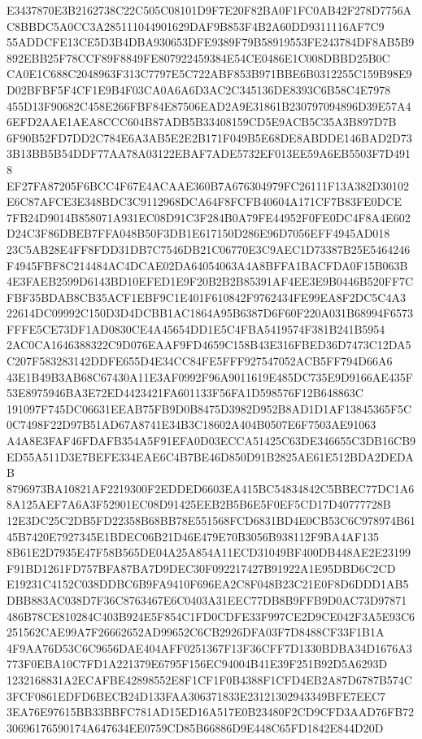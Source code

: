 \documentclass[UTF8,fontset=fandol,zihao=-4,a4paper]{ctexart}
\begin{document}
{{E3437870E3B2162738C22C505C08101D9F7E20F82BA0F1FC0AB42F278D7756AC8BBDC5A0CC3A285111044901629DAF9B853F4B2A60DD9311116AF7C9
55ADDCFE13CE5D3B4DBA930653DFE9389F79B58919553FE243784DF8AB5B9892EBB25F78CCF89F8849FE807922459384E54CE0486E1C008DBBD25B0C
CA0E1C688C2048963F313C7797E5C722ABF853B971BBE6B0312255C159B98E9D02BFBF5F4CF1E9B4F03CA0A6A6D3AC2C345136DE8393C6B58C4E7978
455D13F90682C458E266FBF84E87506EAD2A9E31861B230797094896D39E57A46EFD2AAE1AEA8CCC604B87ADB5B33408159CD5E9ACB5C35A3B897D7B
6F90B52FD7DD2C784E6A3AB5E2E2B171F049B5E68DE8ABDDE146BAD2D733B13BB5B54DDF77AA78A03122EBAF7ADE5732EF013EE59A6EB5503F7D4918
EF27FA87205F6BCC4F67E4ACAAE360B7A676304979FC26111F13A382D30102E6C87AFCE3E348BDC3C9112968DCA64F8FCFB40604A171CF7B83FE0DCE
7FB24D9014B858071A931EC08D91C3F284B0A79FE44952F0FE0DC4F8A4E602D24C3F86DBEB7FFA048B50F3DB1E617150D286E96D7056EFF4945AD018
23C5AB28E4FF8FDD31DB7C7546DB21C06770E3C9AEC1D73387B25E5464246F4945FBF8C214484AC4DCAE02DA64054063A4A8BFFA1BACFDA0F15B063B
4E3FAEB2599D6143BD10EFED1E9F20B2B2B85391AF4EE3E9B0446B520FF7CFBF35BDAB8CB35ACF1EBF9C1E401F610842F9762434FE99EA8F2DC5C4A3
22614DC09992C150D3D4DCBB1AC1864A95B6387D6F60F220A031B68994F6573FFFE5CE73DF1AD0830CE4A45654DD1E5C4FBA5419574F381B241B5954
2AC0CA1646388322C9D076EAAF9FD4659C158B43E316FBED36D7473C12DA5C207F583283142DDFE655D4E34CC84FE5FFF927547052ACB5FF794D66A6
43E1B49B3AB68C67430A11E3AF0992F96A9011619E485DC735E9D9166AE435F53E8975946BA3E72ED4423421FA601133F56FA1D598576F12B648863C
191097F745DC06631EEAB75FB9D0B8475D3982D952B8AD1D1AF13845365F5C0C7498F22D97B51AD67A8741E34B3C18602A404B0507E6F7503AE91063
A4A8E3FAF46FDAFB354A5F91EFA0D03ECCA51425C63DE346655C3DB16CB9ED55A511D3E7BEFE334EAE6C4B7BE46D850D91B2825AE61E512BDA2DEDAB
8796973BA10821AF2219300F2EDDED6603EA415BC54834842C5BBEC77DC1A68A125AEF7A6A3F52901EC08D91425EEB2B5B6E5F0EF5CD17D40777728B
12E3DC25C2DB5FD22358B68BB78E551568FCD6831BD4E0CB53C6C978974B6145B7420E7927345E1BDEC06B21D46E479E70B3056B938112F9BA4AF135
8B61E2D7935E47F58B565DE04A25A854A11ECD31049BF400DB448AE2E23199F91BD1261FD757BFA87BA7D9DEC30F092217427B91922A1E95DBD6C2CD
E19231C4152C038DDBC6B9FA9410F696EA2C8F048B23C21E0F8D6DDD1AB5DBB883AC038D7F36C8763467E6C0403A31EEC77DB8B9FFB9D0AC73D97871
486B78CE810284C403B924E5F854C1FD0CDFE33F997CE2D9CE042F3A5E93C6251562CAE99A7F26662652AD99652C6CB2926DFA03F7D8488CF33F1B1A
4F9AA76D53C6C9656DAE404AFF0251367F13F36CFF7D1330BDBA34D1676A3773F0EBA10C7FD1A221379E6795F156EC94004B41E39F251B92D5A6293D
1232168831A2ECAFBE42898552E8F1CF1F0B4388F1CFD4EB2A87D6787B574C3FCF0861EDFD6BECB24D133FAA306371833E23121302943349BFE7EEC7
3EA76E97615BB33BBFC781AD15ED16A517E0B23480F2CD9CFD3AAD76FB7230696176590174A647634EE0759CD85B66886D9E448C65FD1842E844D20D
}}
\end{document}
